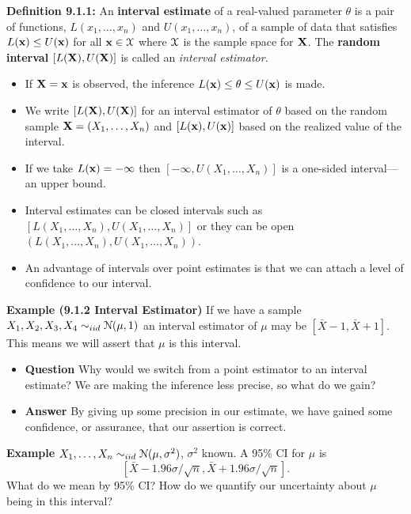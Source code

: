 \documentclass[11pt,]{article}
\providecommand{\tightlist}{%
  \setlength{\itemsep}{0pt}\setlength{\parskip}{0pt}}
\newcommand{\Xndots}{X_1, \ldots, X_n}
\def\bx{{\bf x}}
\def\bX{{\bf X}}
\def\Xbar{\bar{ X}}
\def\Nsc{{\cal N}}
\def\Xsc{{\cal X}}
\begin{document}
\noindent \textbf{Definition 9.1.1:} An \textbf{interval estimate} of a
real-valued parameter \(\theta\) is a pair of functions,
\(L(x_1, \ldots, x_n)\) and \(U(x_1, \ldots, x_n)\), of a sample of data
that satisfies \(L(\bx) \leq U(\bx)\) for all \(\bx \in \Xsc\) where
\(\Xsc\) is the sample space for \(\bX\). The \textbf{random interval}
\([L(\bX),U(\bX)]\) is called an \emph{interval estimator}.

\begin{itemize}
\item If $\bX = \bx$ is observed, the inference $L(\bx) \leq \theta \leq U(\bx)$ is made.
\item We write $[L(\bX), U(\bX)]$ for an interval estimator of $\theta$ based on the random sample $\bX = (X_1,\ldots, X_n)$ and $[L(\bx), U(\bx)]$ based on the realized value of the interval.
\item If we take $L(\bx) = -\infty$ then $[-\infty, U(X_1, \ldots, X_n)]$ is a one-sided interval---an upper bound.
\item Interval estimates can be closed intervals such as $[L(\Xndots),U(\Xndots)]$ or they can be open $\left(L(\Xndots),U(\Xndots)\right).$ 
\end{itemize}

\begin{itemize}
\item An advantage of intervals over point estimates is that we can attach a level of confidence to our interval.
\end{itemize}

\textbf{Example (9.1.2 Interval Estimator)} If we have a sample
\(X_1, X_2, X_3, X_4 \sim_{iid} \Nsc(\mu,1)\) an interval estimator of
\(\mu\) may be \([\Xbar - 1, \Xbar + 1]\). This means we will assert
that \(\mu\) is this interval.

\begin{itemize}
\tightlist
\item
  \textbf{Question} Why would we switch from a point estimator to an
  interval estimate? We are making the inference less precise, so what
  do we gain?
\item
  \textbf{Answer} By giving up some precision in our estimate, we have
  gained some confidence, or assurance, that our assertion is correct.
\end{itemize}

\textbf{Example} \(\Xndots \sim_{iid} \Nsc(\mu,\sigma^2)\), \(\sigma^2\)
known. A 95\% CI for \(\mu\) is
\[\left[\Xbar - 1.96 \sigma/\sqrt{n}, \Xbar + 1.96 \sigma/\sqrt{n}\right].\]
What do we mean by 95\% CI? How do we quantify our uncertainty about
\(\mu\) being in this interval?
\end{document}
